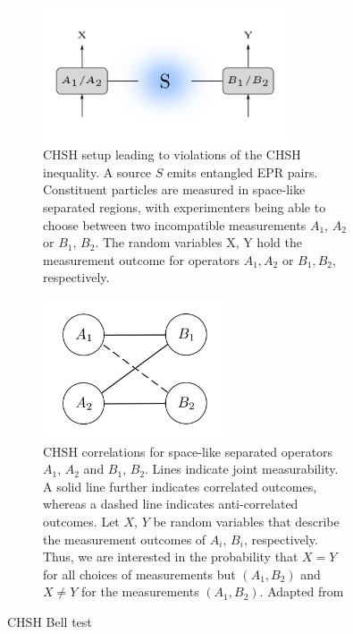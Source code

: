 \begin{figure}
\centering
\begin{subfigure}{\textwidth}
\centering
\includegraphics[width=0.8\textwidth]{images/bell.png}
\caption{CHSH setup leading to violations of the CHSH inequality. A source $S$ emits entangled EPR pairs. Constituent particles are measured in space-like separated regions, with experimenters being able to choose between two incompatible measurements $A_1$, $A_2$ or $B_1$, $B_2$. The random variables X, Y hold the measurement outcome for operators $A_1, A_2$ or $B_1, B_2$, respectively.}
\label{fig:bell}
\end{subfigure}
\vspace{2ex}
\begin{subfigure}{\textwidth}
\centering
\includegraphics[width=0.6\textwidth]{images/chsh.png}
\caption{CHSH correlations for space-like separated operators $A_1$, $A_2$ and $B_1$, $B_2$. Lines indicate joint measurability. A solid line further indicates correlated outcomes, whereas a dashed line indicates anti-correlated outcomes. Let $X$, $Y$ be random variables that describe the measurement outcomes of $A_i$, $B_i$, respectively. Thus, we are interested in the probability that $X=Y$ for all choices of measurements but $(A_1,B_2)$ and $X\neq Y$ for the measurements $(A_1,B_2)$. Adapted from \cite{Spekkens2012}}
\label{fig:chsh}
\end{subfigure}
\caption{CHSH Bell test}
\label{fig:chshbelltest}
\end{figure}


